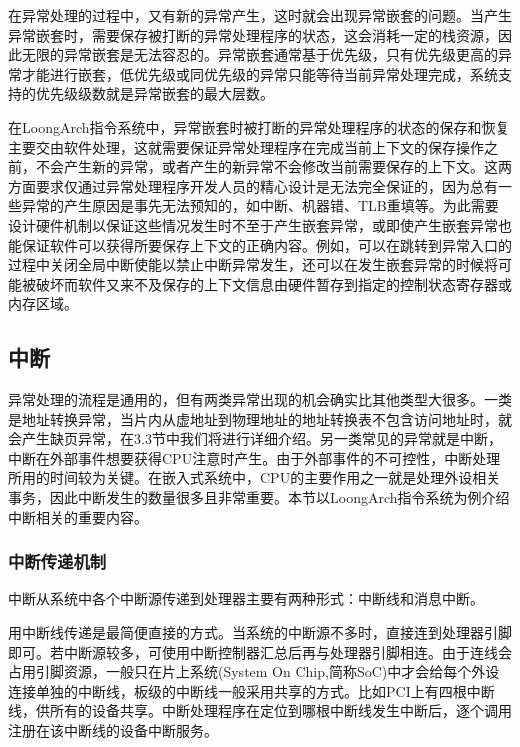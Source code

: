 \documentclass[]{ctexbook}
\begin{document}
在异常处理的过程中，又有新的异常产生，这时就会出现异常嵌套的问题。当产生异常嵌套时，需要保存被打断的异常处理程序的状态，这会消耗一定的栈资源，因此无限的异常嵌套是无法容忍的。异常嵌套通常基于优先级，只有优先级更高的异常才能进行嵌套，低优先级或同优先级的异常只能等待当前异常处理完成，系统支持的优先级级数就是异常嵌套的最大层数。

在LoongArch指令系统中，异常嵌套时被打断的异常处理程序的状态的保存和恢复主要交由软件处理，这就需要保证异常处理程序在完成当前上下文的保存操作之前，不会产生新的异常，或者产生的新异常不会修改当前需要保存的上下文。这两方面要求仅通过异常处理程序开发人员的精心设计是无法完全保证的，因为总有一些异常的产生原因是事先无法预知的，如中断、机器错、TLB重填等。为此需要设计硬件机制以保证这些情况发生时不至于产生嵌套异常，或即使产生嵌套异常也能保证软件可以获得所要保存上下文的正确内容。例如，可以在跳转到异常入口的过程中关闭全局中断使能以禁止中断异常发生，还可以在发生嵌套异常的时候将可能被破坏而软件又来不及保存的上下文信息由硬件暂存到指定的控制状态寄存器或内存区域。

\hypertarget{ux4e2dux65ad}{%
\subsection{中断}\label{ux4e2dux65ad}}

异常处理的流程是通用的，但有两类异常出现的机会确实比其他类型大很多。一类是地址转换异常，当片内从虚地址到物理地址的地址转换表不包含访问地址时，就会产生缺页异常，在3.3节中我们将进行详细介绍。另一类常见的异常就是中断，中断在外部事件想要获得CPU注意时产生。由于外部事件的不可控性，中断处理所用的时间较为关键。在嵌入式系统中，CPU的主要作用之一就是处理外设相关事务，因此中断发生的数量很多且非常重要。本节以LoongArch指令系统为例介绍中断相关的重要内容。

\hypertarget{ux4e2dux65adux4f20ux9012ux673aux5236}{%
\subsubsection{中断传递机制}\label{ux4e2dux65adux4f20ux9012ux673aux5236}}

中断从系统中各个中断源传递到处理器主要有两种形式：中断线和消息中断。

用中断线传递是最简便直接的方式。当系统的中断源不多时，直接连到处理器引脚即可。若中断源较多，可使用中断控制器汇总后再与处理器引脚相连。由于连线会占用引脚资源，一般只在片上系统(System On Chip,简称SoC)中才会给每个外设连接单独的中断线，板级的中断线一般采用共享的方式。比如PCI上有四根中断线，供所有的设备共享。中断处理程序在定位到哪根中断线发生中断后，逐个调用注册在该中断线的设备中断服务。
\end{document}
